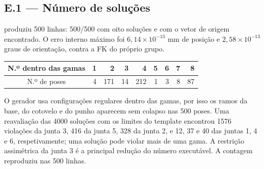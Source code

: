 \subsection{E.1 — Número de soluções}
 produziu 500 linhas: 500/500 com oito soluções e com o vetor de origem encontrado. O erro interno máximo foi $6{,}14\times10^{-13}$ mm de posição e $2{,}58\times10^{-13}$ graus de orientação, contra a FK do próprio grupo.
\begin{center}\small
\begin{tabular}{@{}crrrrrrrr@{}}\toprule
N.º dentro das gamas & 1 & 2 & 3 & 4 & 5 & 6 & 7 & 8\\\midrule
N.º de poses & 4 & 171 & 14 & 212 & 1 & 3 & 8 & 87\\\bottomrule
\end{tabular}
\end{center}
O gerador usa configurações regulares dentro das gamas, por isso os ramos da base, do cotovelo e do punho aparecem sem colapso nas 500 poses. Uma reavaliação das 4000 soluções com os limites do template encontrou 1576 violações da junta 3, 416 da junta 5, 328 da junta 2, e 12, 37 e 40 das juntas 1, 4 e 6, respetivamente; uma solução pode violar mais de uma gama. A restrição assimétrica da junta 3 é a principal redução do número executável. A contagem reproduziu  nas 500 linhas.

